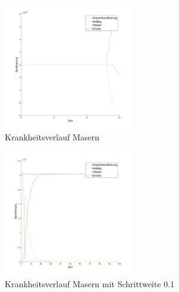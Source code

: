\documentclass[11pt,a4paper]{article}
\begin{document}
\begin{figure}
\includegraphics[width=0.5\textwidth]{bild3-1}
\caption{Krankheitsverlauf Masern}
\end{figure}

\begin{figure}
\includegraphics[width=0.5\textwidth]{bild4-1}
\caption{Krankheitsverlauf Masern mit Schrittweite 0.1}
\end{figure}
  
\end{document}
